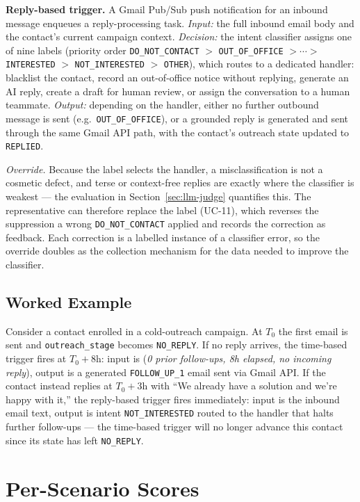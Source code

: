 \documentclass[a4paper]{article}
\begin{document}
\textbf{Reply-based trigger.} A Gmail Pub/Sub push notification for an
inbound message enqueues a reply-processing task. \emph{Input:} the
full inbound email body and the contact's current campaign context.
\emph{Decision:} the intent classifier assigns one of nine labels
(priority order \texttt{DO\_NOT\_CONTACT} $>$ \texttt{OUT\_OF\_OFFICE}
$> \cdots >$ \texttt{INTERESTED} $>$ \texttt{NOT\_INTERESTED} $>$
\texttt{OTHER}), which routes to a dedicated handler: blacklist the
contact, record an out-of-office notice without replying, generate an AI reply,
create a draft for human review, or assign the conversation to a human
teammate. \emph{Output:} depending on the handler, either no further
outbound message is sent (e.g.\ \texttt{OUT\_OF\_OFFICE}), or a grounded
reply is generated and sent through the same Gmail API path, with the
contact's outreach state updated to \texttt{REPLIED}.

\emph{Override.} Because the label selects the handler, a
misclassification is not a cosmetic defect, and terse or context-free
replies are exactly where the classifier is weakest --- the evaluation
in Section~\ref{sec:llm-judge} quantifies this. The
representative can therefore replace the label (UC-11), which
reverses the suppression a wrong \texttt{DO\_NOT\_CONTACT} applied and
records the correction as feedback. Each correction is a labelled
instance of a classifier error, so the override doubles as the
collection mechanism for the data needed to improve the classifier.

\subsection{Worked Example}
Consider a contact enrolled in a cold-outreach campaign. At $T_0$ the
first email is sent and \texttt{outreach\_stage} becomes
\texttt{NO\_REPLY}. If no reply arrives, the time-based trigger fires
at $T_0 + 8\text{h}$: input is (\emph{0 prior follow-ups, 8h elapsed,
no incoming reply}), output is a generated \texttt{FOLLOW\_UP\_1} email
sent via Gmail API. If the contact instead replies at $T_0 + 3\text{h}$
with ``We already have a solution and we're happy with it,'' the
reply-based trigger fires immediately: input is the inbound email text,
output is intent \texttt{NOT\_INTERESTED} routed to the handler that
halts further follow-ups --- the time-based trigger will no longer
advance this contact since its state has left \texttt{NO\_REPLY}.

\newpage
\section{Per-Scenario Scores}
\label{appendix:per-scenario}
\end{document}
